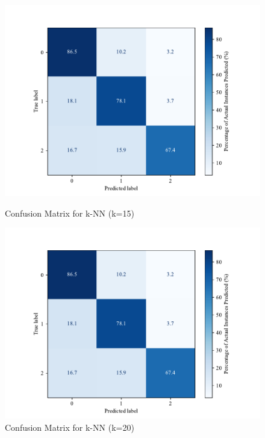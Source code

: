 \begin{figure}[htbp]
    \centering
    \begin{minipage}[b]{0.45\textwidth}
        \centering
        \includegraphics[width=\textwidth]{images/confusion_matrix_knn15.pdf}
        \caption{Confusion Matrix for k-NN (k=15)}
        \label{fig:confusion_knn_15}
    \end{minipage}
    \hfill
    \begin{minipage}[b]{0.45\textwidth}
        \centering
        \includegraphics[width=\textwidth]{images/confusion_matrix_knn20.pdf}
        \caption{Confusion Matrix for k-NN (k=20)}
        \label{fig:confusion_knn_20}
    \end{minipage}
\end{figure}

